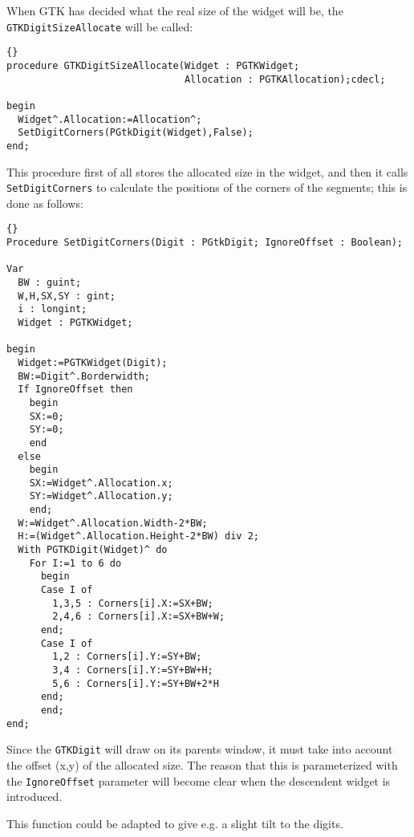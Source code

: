 \documentclass[10pt]{article}
\begin{document}
When GTK has decided what the real size of the widget will be, the
\lstinline|GTKDigitSizeAllocate| will be called:
\begin{lstlisting}{}
procedure GTKDigitSizeAllocate(Widget : PGTKWidget;
                               Allocation : PGTKAllocation);cdecl;
  
begin
  Widget^.Allocation:=Allocation^;
  SetDigitCorners(PGtkDigit(Widget),False);
end;
\end{lstlisting}
This procedure first of all stores the allocated size in the widget, and
then it calls \lstinline|SetDigitCorners| to calculate the positions of
the corners of the segments; this is done as follows:
\begin{lstlisting}{}
Procedure SetDigitCorners(Digit : PGtkDigit; IgnoreOffset : Boolean);

Var
  BW : guint;
  W,H,SX,SY : gint;
  i : longint;
  Widget : PGTKWidget;
  
begin
  Widget:=PGTKWidget(Digit);
  BW:=Digit^.Borderwidth;
  If IgnoreOffset then
    begin
    SX:=0;
    SY:=0;
    end
  else
    begin
    SX:=Widget^.Allocation.x;
    SY:=Widget^.Allocation.y;
    end;
  W:=Widget^.Allocation.Width-2*BW;
  H:=(Widget^.Allocation.Height-2*BW) div 2;  
  With PGTKDigit(Widget)^ do
    For I:=1 to 6 do
      begin
      Case I of
        1,3,5 : Corners[i].X:=SX+BW;
        2,4,6 : Corners[i].X:=SX+BW+W;
      end;
      Case I of
        1,2 : Corners[i].Y:=SY+BW;
        3,4 : Corners[i].Y:=SY+BW+H;
        5,6 : Corners[i].Y:=SY+BW+2*H
      end;
      end;
end;
\end{lstlisting} 
Since the \lstinline|GTKDigit| will draw on its parents window, it must
take into account the offset (x,y) of the allocated size. The reason that
this is parameterized with the \lstinline|IgnoreOffset| parameter will become
clear when the descendent widget is introduced.

This function could be adapted to give e.g. a slight tilt to the digits. 
\end{document}
